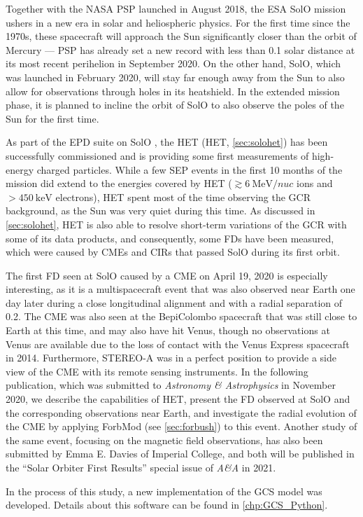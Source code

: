 Together with the NASA \ac{PSP} launched in August 2018, the ESA \ac{SolO} mission ushers in a new era in solar and heliospheric physics. For the first time since the 1970s, these spacecraft will approach the Sun significantly closer than the orbit of Mercury --- \ac{PSP} has already set a new record with less than \SI{0.1}{\AU} solar distance at its most recent perihelion in September 2020. On the other hand, \ac{SolO}, which was launched in February 2020, will stay far enough away from the Sun to also allow for observations through holes in its heatshield. In the extended mission phase, it is planned to incline the orbit of \ac{SolO} to also observe the poles of the Sun for the first time.

As part of the \ac{EPD} suite on \ac{SolO} \citep{RodriguezPacheco-2019-EPD}, the \acl{HET} (\acs{HET}, \autoref{sec:solohet}) has been successfully commissioned and is providing some first measurements of high-energy charged particles. While a few \ac{SEP} events in the first 10 months of the mission did extend to the energies covered by \ac{HET} ($\gtrsim\SI{6}{\mega\electronvolt\per nuc}$ ions and $>\SI{450}{\kilo\electronvolt}$ electrons), \ac{HET} spent most of the time observing the \ac{GCR} background, as the Sun was very quiet during this time. As discussed in \autoref{sec:solohet}, \ac{HET} is also able to resolve short-term variations of the \ac{GCR} with some of its data products, and consequently, some \acp{FD} have been measured, which were caused by \acp{CME} and \acp{CIR} that passed \ac{SolO} during its first orbit.

The first \ac{FD} seen at \ac{SolO} caused by a \ac{CME} on April 19, 2020 is especially interesting, as it is a multispacecraft event that was also observed near Earth one day later during a close longitudinal alignment and with a radial separation of \SI{0.2}{\AU}. The \ac{CME} was also seen at the BepiColombo spacecraft that was still close to Earth at this time, and may also have hit Venus, though no observations at Venus are available due to the loss of contact with the Venus Express spacecraft in 2014. Furthermore, \ac{STEREO}-A was in a perfect position to provide a side view of the \ac{CME} with its remote sensing instruments. In the following publication, which was submitted to \textit{Astronomy \& Astrophysics} in November 2020, we describe the capabilities of \ac{HET}, present the \ac{FD} observed at \ac{SolO} and the corresponding observations near Earth, and investigate the radial evolution of the \ac{CME} by applying \acs{ForbMod} (see \autoref{sec:forbush}) to this event. Another study of the same event, focusing on the magnetic field observations, has also been submitted by Emma E. Davies of Imperial College, and both will be published in the ``Solar Orbiter First Results'' special issue of \textit{A\&A} in 2021.

In the process of this study, a new implementation of the \ac{GCS} model \citep{Thernisien-2011-GCS} was developed. Details about this software can be found in \autoref{chp:GCS_Python}.

